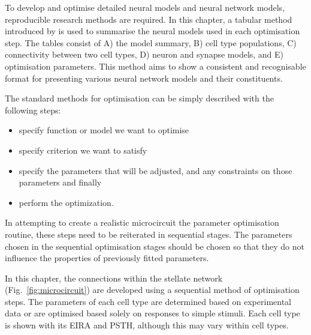 
\smallskip{}

To develop and optimise detailed neural models and neural network models,
reproducible research methods are required. In this chapter, a tabular method
introduced by \citet{NordlieGewaltigEtAl:2009} is used to summarise the neural
models used in each optimisation step. The tables consist of A) the model
summary, B) cell type populations, C) connectivity between two cell types, D)
neuron and synapse models, and E) optimisation parameters.  This method aims to
show a consistent and recognisable format for presenting various neural network
models and their constituents. 

\smallskip{}

The standard methods for optimisation can be simply described with the following
steps:\begin{itemize}
\item specify function or model we want to optimise
\item specify criterion we want to satisfy
\item specify the parameters that will be adjusted, 
    and any constraints on those parameters and finally
\item perform the optimization.
\end{itemize}
In attempting to create a realistic microcircuit the parameter optimisation
routine, these steps need to be reiterated in sequential stages. The parameters
chosen in the sequential optimisation stages should be chosen so that they do
not influence the properties of previously fitted parameters.

\smallskip{}

In this chapter, the connections within the stellate network
(Fig.~\ref{fig:microcircuit}) are developed using a sequential method of
optimisation steps.  The parameters of each cell type are determined based on
experimental data or are optimised based solely on responses to simple stimuli.
Each cell type is shown with its \gls{EIRA} and \gls{PSTH}, although this may
vary within cell types.


